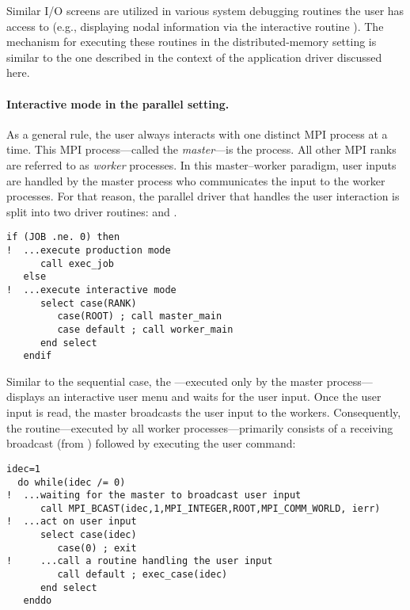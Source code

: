 Similar I/O screens are utilized in various system debugging routines the user has access to (e.g., displaying nodal information via the interactive routine ). The mechanism for executing these routines in the distributed-memory setting is similar to the one described in the context of the application driver  discussed here.

\paragraph{Interactive mode in the parallel setting.}
As a general rule, the user always interacts with one distinct MPI process at a time. This MPI process---called the \emph{master}---is the  process. All other MPI ranks are referred to as \emph{worker} processes. In this master--worker paradigm, user inputs are handled by the master process who communicates the input to the worker processes. For that reason, the parallel driver that handles the user interaction is split into two driver routines:  and .
\begin{lstlisting}[caption=Splitting master and worker execution paths., label={lst:master_worker_main}]
   if (JOB .ne. 0) then
!  ...execute production mode
      call exec_job
   else
!  ...execute interactive mode
      select case(RANK)
         case(ROOT) ; call master_main
         case default ; call worker_main
      end select
   endif
\end{lstlisting}

Similar to the sequential case, the ---executed only by the master process---displays an interactive user menu and waits for the user input. Once the user input is read, the master broadcasts the user input to the workers. Consequently, the  routine---executed by all worker processes---primarily consists of a receiving broadcast (from ) followed by executing the user command:

\begin{lstlisting}[caption=Interactive mode in distributed-memory execution., label={lst:interactive_mode_parallel}]
  idec=1
  do while(idec /= 0)
!  ...waiting for the master to broadcast user input
      call MPI_BCAST(idec,1,MPI_INTEGER,ROOT,MPI_COMM_WORLD, ierr)
!  ...act on user input
      select case(idec)
         case(0) ; exit
!     ...call a routine handling the user input
         call default ; exec_case(idec)
      end select
   enddo
\end{lstlisting}

